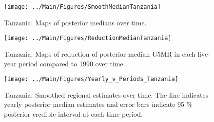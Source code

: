 \documentclass[12pt]{article}\usepackage[]{graphicx}\usepackage[]{color}
\newenvironment{knitrout}{}{} %
\begin{document}
\begin{knitrout}
\color{fgcolor}\begin{figure}[bht]

{\centering \texttt{[image: ../Main/Figures/SmoothMedianTanzania]} 

}

\caption[Tanzania]{Tanzania: Maps of posterior medians over time.}\label{fig:unnamed-chunk-304}
\end{figure}


\end{knitrout}
\begin{knitrout}
\color{fgcolor}\begin{figure}[bht]

{\centering \texttt{[image: ../Main/Figures/ReductionMedianTanzania]} 

}

\caption[Tanzania]{Tanzania: Maps of reduction of posterior median U5MR in each five-year period compared to 1990 over time.}\label{fig:unnamed-chunk-305}
\end{figure}


\end{knitrout}
\begin{knitrout}
\color{fgcolor}\begin{figure}[bht]

{\centering \texttt{[image: ../Main/Figures/Yearly\_v\_Periods\_Tanzania]} 

}

\caption[Tanzania]{Tanzania: Smoothed regional estimates over time. The line indicates yearly posterior median estimates and error bars indicate 95 \% posterior credible interval at each time period.}\label{fig:unnamed-chunk-306}
\end{figure}


\end{knitrout}
\end{document}
